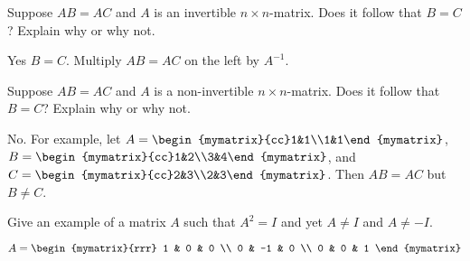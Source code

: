 \begin{enumialphparenastyle}
\begin{ex}
  Suppose $AB=AC$ and $A$ is an invertible $n\times n$-matrix. Does it
  follow that $B=C$? Explain why or why not.
  \begin{sol}
    Yes $B=C$. Multiply $AB = AC$ on the left by $A^{-1}$. 
  \end{sol}
\end{ex}

\begin{ex}
  Suppose $AB=AC$ and $A$ is a non-invertible $n\times n$-matrix. Does
  it follow that $B=C$? Explain why or why not.
  \begin{sol}
    No. For example, let
    $A=\begin{mymatrix}{cc}1&1\\1&1\end{mymatrix}$,
    $B=\begin{mymatrix}{cc}1&2\\3&4\end{mymatrix}$, and
    $C=\begin{mymatrix}{cc}2&3\\2&3\end{mymatrix}$. Then $AB=AC$ but
    $B\neq C$.
  \end{sol}
\end{ex}

\begin{ex}
  Give an example of a matrix $A$ such that $A^{2}=I$ and yet
  $A\neq I$ and $A\neq -I$.
  \begin{sol}
    $A = \begin{mymatrix}{rrr}
      1 & 0 & 0 \\
      0 & -1 & 0 \\
      0 & 0 & 1
    \end{mymatrix} $
  \end{sol}
\end{ex}

\end{enumialphparenastyle}
